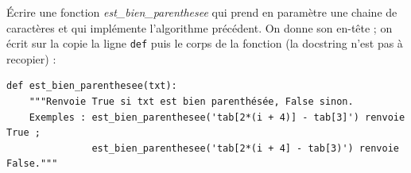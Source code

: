 \documentclass[a4paper, noanswers, addpoints, 12pt]{exam}
\begin{document}
\begin{questions}
\question[3\half] Écrire une fonction \textit{est\_bien\_parenthesee} qui prend en paramètre une chaine de caractères et qui implémente l'algorithme précédent. On donne son en-tête ; on écrit sur la copie la ligne \texttt{def} puis le corps de la fonction (la docstring n'est pas à recopier) :
\par\noindent\begin{minipage}{\linewidth}
\begin{lstlisting}[style=entete]
def est_bien_parenthesee(txt):
    """Renvoie True si txt est bien parenthésée, False sinon.
    Exemples : est_bien_parenthesee('tab[2*(i + 4)] - tab[3]') renvoie True ;
               est_bien_parenthesee('tab[2*(i + 4] - tab[3)') renvoie False."""
\end{lstlisting}
\end{minipage}\par

\end{questions}
\end{document}
